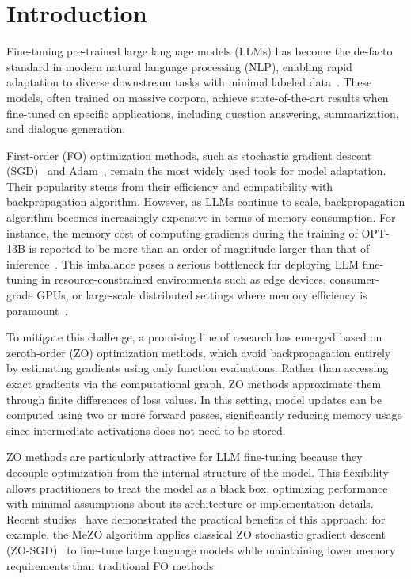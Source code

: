 \documentclass{article}
\theoremstyle{plain}
\theoremstyle{definition}
\theoremstyle{remark}
\begin{document}
\section{Introduction} \label{sec:intro}
Fine-tuning pre-trained large language models (LLMs) has become the de-facto standard in modern natural language processing (NLP), enabling rapid adaptation to diverse downstream tasks with minimal labeled data~\cite{raffel2023exploringlimitstransferlearning, sanh2022multitaskpromptedtrainingenables}. These models, often trained on massive corpora, achieve state-of-the-art results when fine-tuned on specific applications, including question answering, summarization, and dialogue generation.

First-order (FO) optimization methods, such as stochastic gradient descent (SGD)~\cite{amari1993backpropagation} and Adam~\cite{kingma2014adam}, remain the most widely used tools for model adaptation. Their popularity stems from their efficiency and compatibility with backpropagation algorithm. However, as LLMs continue to scale, backpropagation algorithm becomes increasingly expensive in terms of memory consumption. For instance, the memory cost of computing gradients during the training of OPT-13B is reported to be more than an order of magnitude larger than that of inference~\cite{zhu2023efficient}. This imbalance poses a serious bottleneck for deploying LLM fine-tuning in resource-constrained environments such as edge devices, consumer-grade GPUs, or large-scale distributed settings where memory efficiency is paramount~\cite{han2015deep}.

To mitigate this challenge, a promising line of research has emerged based on zeroth-order (ZO) optimization methods, which avoid backpropagation entirely by estimating gradients using only function evaluations. Rather than accessing exact gradients via the computational graph, ZO methods approximate them through finite differences of loss values. In this setting, model updates can be computed using two or more forward passes, significantly reducing memory usage since intermediate activations does not need to be stored.

ZO methods are particularly attractive for LLM fine-tuning because they decouple optimization from the internal structure of the model. This flexibility allows practitioners to treat the model as a black box, optimizing performance with minimal assumptions about its architecture or implementation details. Recent studies~\cite{malladi2023mezo} have demonstrated the practical benefits of this approach: for example, the MeZO algorithm applies classical ZO stochastic gradient descent (ZO-SGD)~\cite{ghadimi2013stochastic} to fine-tune large language models while maintaining lower memory requirements than traditional FO methods.
\end{document}
